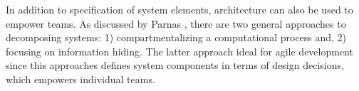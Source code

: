In addition to specification of system elements, architecture can also be used to empower teams.
As discussed by Parnas \cite{Parnas72}, there are two general approaches to decomposing systems: 1) compartmentalizing a computational process and, 2) focusing on information hiding.
The latter approach ideal for agile development since this approaches defines system components in terms of design decisions, which empowers individual teams.